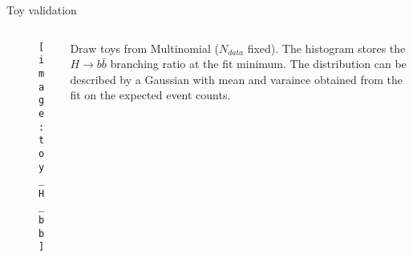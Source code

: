 \begin{block}{Toy validation}
\begin{columns}
\begin{column}{.3\textwidth}
    \begin{figure}
        \centering\texttt{[image: toy\_H\_bb]}
    \end{figure}
\end{column}
\begin{column}{.7\textwidth}
    Draw toys from Multinomial ($N_{data}$ fixed).
    The histogram stores the $H\to b\bar{b}$ branching ratio at the fit minimum.
    The distribution can be described by a Gaussian with
    mean and varaince obtained from the fit on the expected event counts.
\end{column}
\end{columns}
\end{block}

